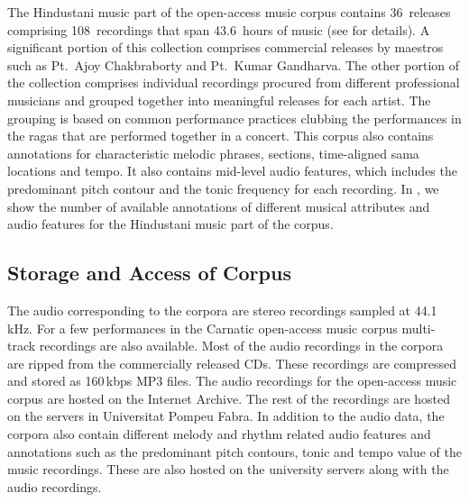 The Hindustani music part of the open-access music corpus contains 36~releases comprising 108~recordings that span 43.6~hours of music (see  for details). A significant portion of this collection comprises commercial releases by maestros such as Pt.~Ajoy Chakbraborty and Pt.~Kumar Gandharva. The other portion of the collection comprises individual recordings procured from different professional musicians and grouped together into meaningful releases for each artist. The grouping is based on common performance practices clubbing the performances in the \glspl{raga} that are performed together in a concert. This corpus also contains annotations for characteristic melodic phrases, sections, time-aligned sama locations and tempo. It also contains mid-level audio features, which includes the predominant pitch contour and the tonic frequency for each recording. In , we show the number of available annotations of different musical attributes and audio features for the Hindustani music part of the corpus. 

\subsection{Storage and Access of Corpus}
\label{sec:corpus_storage_and_access}


The audio corresponding to the corpora are stereo recordings sampled at 44.1\,kHz. For a few performances in the Carnatic open-access music corpus multi-track recordings are also available. Most of the audio recordings in the corpora are ripped from the commercially released CDs. These recordings are compressed and stored as 160\,kbps MP3 files. The audio recordings for the open-access music corpus are hosted on the Internet Archive. The rest of the recordings are hosted on the servers in Universitat Pompeu Fabra. In addition to the audio data, the corpora also contain different melody and rhythm related audio features and annotations such as the predominant pitch contours, tonic and tempo value of the music recordings. These are also hosted on the university servers along with the audio recordings.

